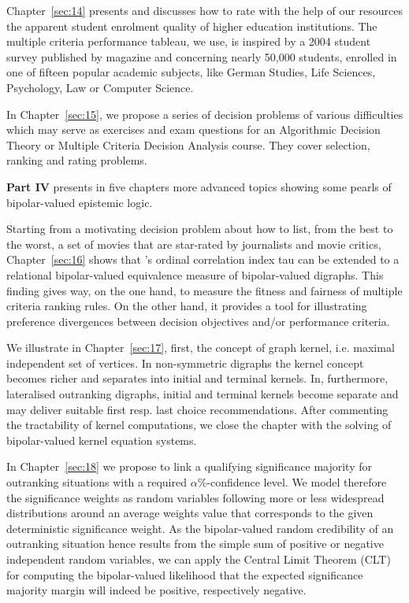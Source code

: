 Chapter~\ref{sec:14} presents and discusses how to rate with the help of our \Digraph resources the apparent student enrolment quality of higher education institutions. The multiple criteria performance tableau, we use, is inspired by a 2004 student survey published by \Spiegel magazine and concerning nearly 50,000 students, enrolled in one of fifteen popular academic subjects, like German Studies, Life Sciences, Psychology, Law or Computer Science.

In Chapter~\ref{sec:15}, we propose a series of decision problems of various difficulties which may serve as exercises and exam questions for an Algorithmic Decision Theory or Multiple Criteria Decision Analysis course. They cover selection, ranking and rating problems.
\vspace{5pt}

\textbf{Part IV} presents in five chapters more advanced topics showing some pearls of bipolar-valued epistemic logic.

Starting from a motivating decision problem about how to list, from the best to the worst, a set of movies that are star-rated by journalists and movie critics, Chapter~\ref{sec:16} shows that \Kendall’s ordinal correlation index tau can be extended to a relational bipolar-valued equivalence measure of bipolar-valued digraphs. This finding gives way, on the one hand, to measure the fitness and fairness of multiple criteria ranking rules. On the other hand, it provides a tool for illustrating preference divergences between decision objectives and/or performance criteria.

We illustrate in Chapter~\ref{sec:17}, first, the concept of graph kernel, i.e. maximal independent set of vertices. In non-symmetric digraphs the kernel concept becomes richer and separates into initial and terminal kernels. In, furthermore, lateralised outranking digraphs, initial and terminal kernels become separate and may deliver suitable first resp. last choice recommendations. After commenting the tractability of kernel computations, we close the chapter with the solving of bipolar-valued kernel equation systems.

In Chapter~\ref{sec:18} we propose to link a qualifying significance majority for outranking situations with a required $\alpha\%$-confidence level. We model therefore the significance weights as random variables following more or less widespread distributions around an average weights value that corresponds to the given deterministic significance weight. As the bipolar-valued random credibility of an outranking situation hence results from the simple sum of positive or negative independent random variables, we can apply the Central Limit Theorem (CLT) for computing the bipolar-valued likelihood that the expected significance majority margin will indeed be positive, respectively negative.

